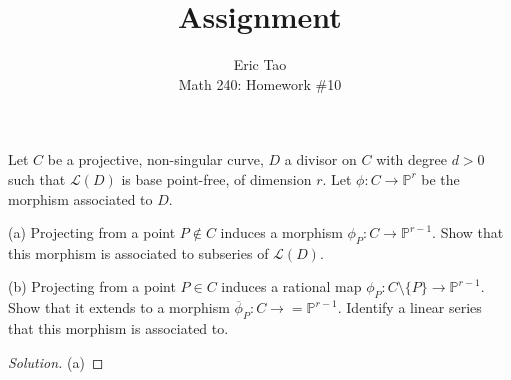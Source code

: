 \documentclass[10pt]{article}
\newenvironment{problem}[2][Problem]{\begin{trivlist}
\item[\hskip \labelsep {\bfseries #1}\hskip \labelsep {\bfseries #2.}]}{\end{trivlist}}
\begin{document}
 
\title{Assignment}
\author{Eric Tao\\
Math 240: Homework \#10}
\maketitle
 
\begin{problem}{10.1}

Let $C$ be a projective, non-singular curve, $D$ a divisor on $C$ with degree $d > 0$ such that $\mathcal{L}(D)$ is base point-free, of dimension $r$. Let $\phi: C \to \mathbb{P}^r$ be the morphism associated to $D$.

(a) Projecting from a point $P \not \in C$ induces a morphism $\phi_P : C \to \mathbb{P}^{r-1}$. Show that this morphism is associated to subseries of $\mathcal{L}(D)$.

(b)  Projecting from a point $P \in C$ induces a rational map $\phi_P : C \setminus \{ P \} \to \mathbb{P}^{r-1}$. Show that it extends to a morphism $\overline{\phi}_P: C \to= \mathbb{P}^{r-1}$. Identify a linear series that this morphism is associated to.

\end{problem}

\begin{proof}[Solution]

(a)



\end{proof}
\end{document}
